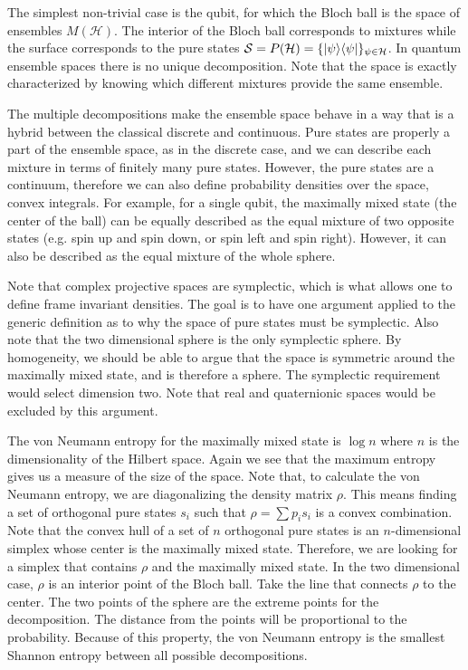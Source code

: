 The simplest non-trivial case is the qubit, for which the Bloch ball is the space of ensembles $M(\mathcal{H})$. The interior of the Bloch ball corresponds to mixtures  while the surface corresponds to the pure states $\mathcal{S} = P(\mathcal{H}) = \{ |\psi\rangle \langle\psi| \}_{\psi \in \mathcal{H}}$. In quantum ensemble spaces there is no unique decomposition. Note that the space is exactly characterized by knowing which different mixtures provide the same ensemble.

The multiple decompositions make the ensemble space behave in a way that is a hybrid between the classical discrete and continuous. Pure states are properly a part of the ensemble space, as in the discrete case, and we can describe each mixture in terms of finitely many pure states. However, the pure states are a continuum, therefore we can also define probability densities over the space, convex integrals. For example, for a single qubit, the maximally mixed state (the center of the ball) can be equally described as the equal mixture of two opposite states (e.g. spin up and spin down, or spin left and spin right). However, it can also be described as the equal mixture of the whole sphere.

Note that complex projective spaces are symplectic, which is what allows one to define frame invariant densities. The goal is to have one argument applied to the generic definition as to why the space of pure states must be symplectic. Also note that the two dimensional sphere is the only symplectic sphere. By homogeneity, we should be able to argue that the space is symmetric around the maximally mixed state, and is therefore a sphere. The symplectic requirement would select dimension two. Note that real and quaternionic spaces would be excluded by this argument.

The von Neumann entropy for the maximally mixed state is $\log n$ where $n$ is the dimensionality of the Hilbert space. Again we see that the maximum entropy gives us a measure of the size of the space. Note that, to calculate the von Neumann entropy, we are diagonalizing the density matrix $\rho$. This means finding a set of orthogonal pure states $s_i$ such that $\rho = \sum p_i s_i$ is a convex combination. Note that the convex hull of a set of $n$ orthogonal pure states is an $n$-dimensional simplex whose center is the maximally mixed state. Therefore, we are looking for a simplex that contains $\rho$ and the maximally mixed state. In the two dimensional case, $\rho$ is an interior point of the Bloch ball. Take the line that connects $\rho$ to the center. The two points of the sphere are the extreme points for the decomposition. The distance from the points will be proportional to the probability. Because of this property, the von Neumann entropy is the smallest Shannon entropy between all possible decompositions.


